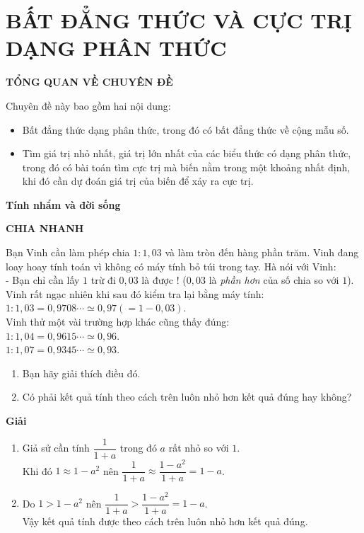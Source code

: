\section{BẤT ĐẲNG THỨC VÀ CỰC TRỊ DẠNG PHÂN THỨC}

\begin{center}
 \large \textbf{TỔNG QUAN VỀ CHUYÊN ĐỀ}
\end{center}
Chuyên đề này bao gồm hai nội dung:
\begin{itemize}
	\item Bất đẳng thức dạng phân thức, trong đó có bất đẳng thức về cộng mẫu số.
	\item Tìm giá trị nhỏ nhất, giá trị lớn nhất của các biểu thức có dạng phân thức, trong đó có bài toán tìm cực trị mà biến nằm trong một khoảng nhất định, khi đó cần dự đoán giá trị của biến để xảy ra cực trị.
\end{itemize}
\textbf{Tính nhẩm và đời sống}
\begin{center}
	\textbf{CHIA NHANH}
\end{center}
Bạn Vinh cần làm phép chia $1:1{,}03$ và làm tròn đến hàng phần trăm. Vinh đang loay hoay tính toán vì không có máy tính bỏ túi trong tay. Hà nói với Vinh:\\
- Bạn chỉ cần lấy $1$ trừ đi $0{,}03$ là được $!$ ($0{,}03$ là \textit{phần hơn} của số chia so với $1$).\\
	Vinh rất ngạc nhiên khi sau đó kiểm tra lại bằng máy tính:\\
	$1:1{,}03=0{,}9708\cdots\simeq 0{,}97(=1-0{,}03)$.\\ 
	Vinh thử một vài trường hợp khác cũng thấy đúng:\\
$1:1{,}04=0{,}9615\cdots\simeq 0{,}96$.\\	
$1:1{,}07=0{,}9345\cdots\simeq 0{,}93$.
\begin{enumerate}
	\item Bạn hãy giải thích điều đó.
	\item Có phải kết quả tính theo cách trên luôn nhỏ hơn kết quả đúng hay không?
\end{enumerate}
\textbf{Giải}
\begin{enumerate}
	\item Giả sử cần tính $\dfrac{1}{1+a}$ trong đó $a$ rất nhỏ so với $1$.\\ Khi đó $1\approx 1-a^2$ nên $\dfrac{1}{1+a}\approx \dfrac{1-a^2}{1+a}=1-a$.
	\item  Do $1>1-a^2$ nên $\dfrac{1}{1+a}>\dfrac{1-a^2}{1+a}=1-a$.\\
	Vậy kết quả tính được theo cách trên luôn nhỏ hơn kết quả đúng.
\end{enumerate}

